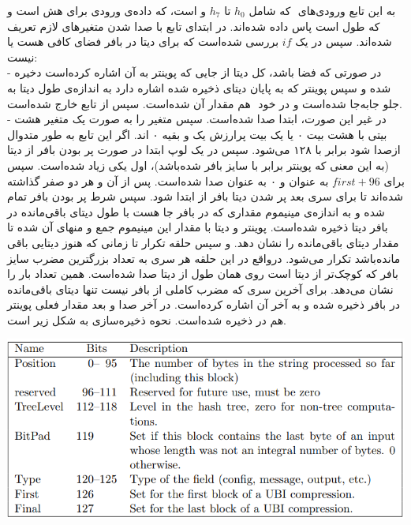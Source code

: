 به این تابع ورودی‌های ‌ که  شامل $ h_0 $ تا $ h_7 $ و   است،  که داده‌ی ورودی برای هش است و  که طول  است پاس داده شده‌اند. در ابتدای تابع با صدا شدن \hyperref[subsec:DECL-STATE-BIG]{} متغیرهای لازم تعریف شده‌اند. سپس در یک $ if $ بررسی شده‌است که برای دیتا در بافر فضای کافی هست یا نیست: \\
- در صورتی که فضا باشد،‌ کل دیتا از جایی که پوینتر به آن اشاره کرده‌است دخیره شده‌ و سپس پوینتر که به پایان دیتای ذخیره شده اشاره دارد به اندازه‌ی طول دیتا به جلو جابه‌جا شده‌است و در خود ‌ هم مقدار ‌آن  شده‌است. سپس از تابع خارج شده‌است.
\\
- در غیر این صورت، ابتدا  \hyperref[subsec:READ-STATE-BIG]{} صدا شده‌است. سپس متغیر  را به صورت یک متغیر هشت بیتی با هشت بیت ۰ یا یک بیت پرارزش یک و بقیه ۰ اند. اگر این تابع به طور متدوال از\hyperref[subsec:skein-hash]{}صدا شود  برابر با ۱۲۸ می‌شود. سپس در یک لوپ ابتدا در صورت پر بودن بافر از دیتا (به این معنی که پوینتر برابر با سایز بافر شده‌باشد)،‌ اول   یکی زیاد شده‌است. سپس\hyperref[subsec:UBI-BIG]{} برای $ first + 96 $ به عنوان  و ۰ به عنوان  صدا شده‌است. پس از آن  و  هر دو صفر گذاشته شده‌اند تا برای سری بعد پر شدن دیتا بافر از ابتدا  شود. سپس شرط پر بودن بافر تمام شده و به اندازه‌ی مینیموم مقداری که در بافر جا هست با طول دیتای باقی‌مانده در بافر دیتا ذخیره شده‌است. پوینتر و دیتا با مقدار این مینیموم جمع و  منهای آن شده‌ تا مقدار دیتای باقی‌مانده را نشان دهد. و سپس حلقه تکرار تا زمانی که هنوز دیتایی باقی مانده‌باشد تکرار می‌شود. درواقع در این حلقه هر سری به تعداد بزرگترین مضرب سایز بافر که کوچک‌تر از  دیتا است روی همان طول از دیتا \hyperref[subsec:UBI-BIG]{} صدا شده‌است.  همین تعداد بار را نشان می‌دهد. برای آخرین سری که مضرب کاملی از بافر نیست تنها دیتای باقی‌مانده در بافر ذخیره شده و  به آخر آن اشاره کرده‌است. 
در آخر \hyperref[subsec:WRITE-STATE-BIG]{}
صدا و بعد مقدار فعلی پوینتر هم در  ذخیره شده‌است. 
نحوه ذخیره‌سازی  به شکل زیر است. 
\begin{center}
	\includegraphics[width=14cm]{images/tweak.png}
\end{center}

